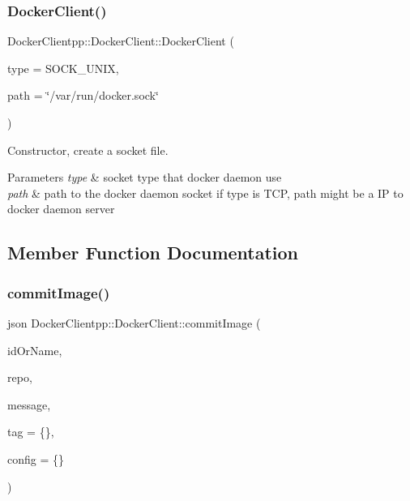 \subsubsection{\texorpdfstring{DockerClient()}{DockerClient()}}
{\footnotesize\ttfamily Docker\+Clientpp\+::\+Docker\+Client\+::\+Docker\+Client (\begin{DoxyParamCaption}\item[{const S\+O\+C\+K\+\_\+\+T\+Y\+PE}]{type = {\ttfamily SOCK\+\_\+UNIX},  }\item[{const string \&}]{path = {\ttfamily \char`\"{}/var/run/docker.sock\char`\"{}} }\end{DoxyParamCaption})}



Constructor, create a socket file. 


\begin{DoxyParams}{Parameters}
{\em type} & socket type that docker daemon use \\
\hline
{\em path} & path to the docker daemon socket if type is T\+CP, path might be a IP to docker daemon server \\
\hline
\end{DoxyParams}


\subsection{Member Function Documentation}
\mbox{\label{classDockerClientpp_1_1DockerClient_a2d65a1d1dca58bc44fb6034925fa8ad2}} 
\subsubsection{\texorpdfstring{commitImage()}{commitImage()}}
{\footnotesize\ttfamily json Docker\+Clientpp\+::\+Docker\+Client\+::commit\+Image (\begin{DoxyParamCaption}\item[{const string \&}]{id\+Or\+Name,  }\item[{const string \&}]{repo,  }\item[{const string \&}]{message,  }\item[{const string \&}]{tag = {\ttfamily \{\}},  }\item[{const json \&}]{config = {\ttfamily \{\}} }\end{DoxyParamCaption})}




